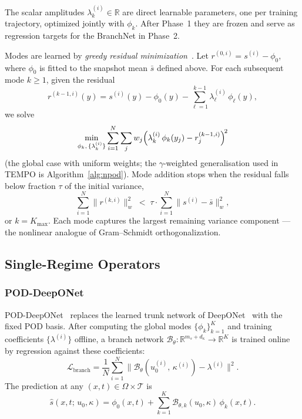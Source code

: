 \documentclass{article}
\begin{document}
The scalar amplitudes $\lambda_k^{(i)} \in \mathbb{R}$ are direct
learnable parameters, one per training trajectory, optimized jointly
with $\phi_k$.
After Phase~1 they are frozen and serve as regression targets for the
BranchNet in Phase~2.

Modes are learned by \emph{greedy residual minimization}~\cite{Mou2026}.
Let $r^{(0,i)} = s^{(i)} - \phi_0$, where $\phi_0$ is fitted to the snapshot mean $\bar{s}$ defined above.
For each subsequent mode $k \ge 1$, given the residual
\begin{equation}
  r^{(k-1,i)}(y)
  = s^{(i)}(y)
  - \phi_0(y)
  - \sum_{\ell=1}^{k-1}\lambda_\ell^{(i)}\,\phi_\ell(y),
  \label{eq:residual_global}
\end{equation}
we solve
\begin{equation}
  \min_{\phi_k,\,\{\lambda_k^{(i)}\}}
  \sum_{i=1}^{N} \sum_j w_j
  \Bigl(\lambda_k^{(i)}\,\phi_k(y_j) - r_j^{(k-1,i)}\Bigr)^{\!2}
  \label{eq:neuralpod_loss}
\end{equation}
(the global case with uniform weights; the $\gamma$-weighted
generalisation used in TEMPO is Algorithm~\ref{alg:npod}).
Mode addition stops when the residual falls below fraction $\tau$ of
the initial variance,
\begin{equation}
  \sum_{i=1}^N \|r^{(k,i)}\|_w^2
  \;<\;
  \tau \cdot \sum_{i=1}^N \|s^{(i)} - \bar{s}\|_w^2,
  \label{eq:npod_tol}
\end{equation}
or $k = K_{\max}$.
Each mode captures the largest remaining variance component — the nonlinear analogue of Gram--Schmidt orthogonalization.

\subsection{Single-Regime Operators}\label{sec:single}


\subsubsection{POD-DeepONet}

POD-DeepONet~\cite{Lu2022} replaces the learned trunk network of
DeepONet~\cite{Lu2019} with the fixed POD basis.
After computing the global modes $\{\phi_k\}_{k=1}^K$ and training
coefficients $\{\lambda^{(i)}\}$ offline, a branch network
$\mathcal{B}_\theta : \mathbb{R}^{m_s + d_\kappa} \to \mathbb{R}^K$
is trained online by regression against these coefficients:
\begin{equation}
  \mathcal{L}_{\mathrm{branch}}
  = \frac{1}{N}\sum_{i=1}^{N}
    \bigl\|\mathcal{B}_\theta(u_0^{(i)},\,\kappa^{(i)})
    - \lambda^{(i)}\bigr\|^2.
  \label{eq:pod_branch_loss}
\end{equation}
The prediction at any $(x,t) \in \Omega \times \mathcal{T}$ is
\begin{equation}
  \hat{s}(x,t;\,u_0,\kappa)
  = \phi_0(x,t)
  + \sum_{k=1}^{K}
    \mathcal{B}_{\theta,k}(u_0,\kappa)\,\phi_k(x,t).
  \label{eq:pod_predict}
\end{equation}
\end{document}
